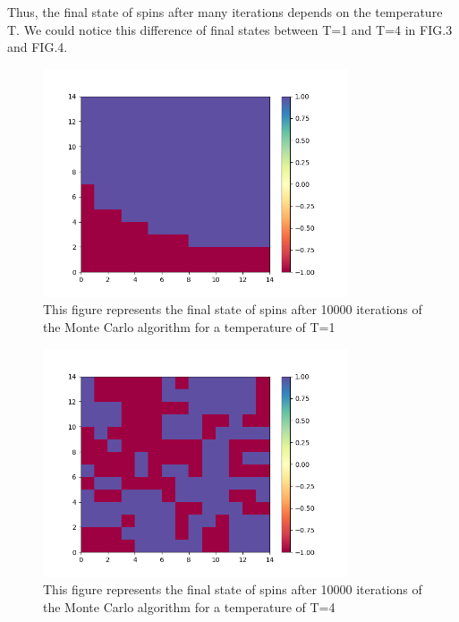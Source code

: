 \documentclass[aps,twocolumn,twoside,secnumarabic,balancelastpage,amsmath,amssymb,nofootinbib,hyperref=pdftex]{revtex4}
\begin{document}
\par Thus, the final state of spins after many iterations depends on the temperature T. We could notice this difference of final states between T=1 and T=4 in FIG.3 and FIG.4. 
\begin{figure}[htb]
\includegraphics[width=9cm]{final_spins.png}	
\caption{This figure represents the final state of spins after 10000 iterations of the Monte Carlo algorithm for a temperature of T=1}
\end{figure}
\begin{figure}[htb]
\includegraphics[width=9cm]{final_spins4.png}	
\caption{This figure represents the final state of spins after 10000 iterations of the Monte Carlo algorithm for a temperature of T=4}
\end{figure}
\end{document}
